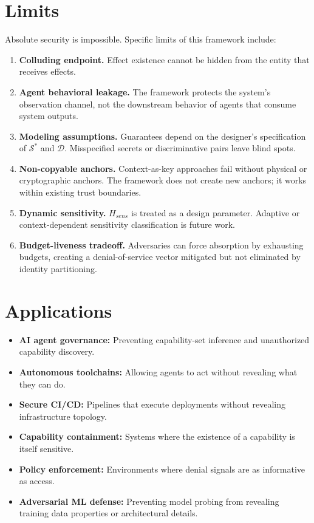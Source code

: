 \documentclass[11pt,a4paper]{article}
\begin{document}
\section{Limits}

Absolute security is impossible. Specific limits of this framework include:

\begin{enumerate}
  \item \textbf{Colluding endpoint.} Effect existence cannot be hidden from the entity that receives effects.
  \item \textbf{Agent behavioral leakage.} The framework protects the system's observation channel, not the downstream behavior of agents that consume system outputs.
  \item \textbf{Modeling assumptions.} Guarantees depend on the designer's specification of $\mathcal{S}^*$ and $\mathcal{D}$. Misspecified secrets or discriminative pairs leave blind spots.
  \item \textbf{Non-copyable anchors.} Context-as-key approaches fail without physical or cryptographic anchors. The framework does not create new anchors; it works within existing trust boundaries.
  \item \textbf{Dynamic sensitivity.} $H_{sens}$ is treated as a design parameter. Adaptive or context-dependent sensitivity classification is future work.
  \item \textbf{Budget-liveness tradeoff.} Adversaries can force absorption by exhausting budgets, creating a denial-of-service vector mitigated but not eliminated by identity partitioning.
\end{enumerate}

\section{Applications}

\begin{itemize}
  \item \textbf{AI agent governance:} Preventing capability-set inference and unauthorized capability discovery.
  \item \textbf{Autonomous toolchains:} Allowing agents to act without revealing what they can do.
  \item \textbf{Secure CI/CD:} Pipelines that execute deployments without revealing infrastructure topology.
  \item \textbf{Capability containment:} Systems where the existence of a capability is itself sensitive.
  \item \textbf{Policy enforcement:} Environments where denial signals are as informative as access.
  \item \textbf{Adversarial ML defense:} Preventing model probing from revealing training data properties or architectural details.
\end{itemize}
\end{document}
